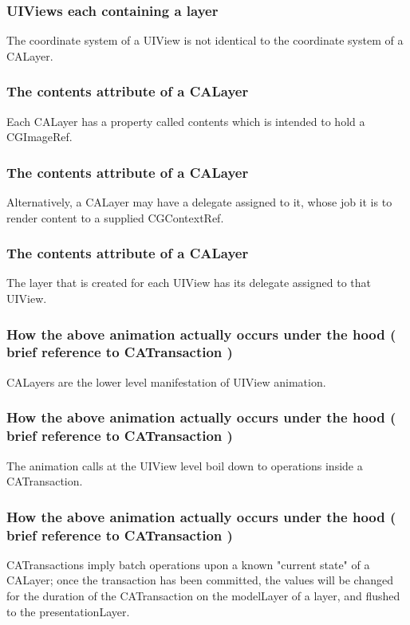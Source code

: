 \documentclass[10pt]{beamer}
\begin{document}
\begin{frame}[fragile]
  \frametitle{UIViews each containing a layer}
  The coordinate system of a UIView is not identical to the coordinate system of a CALayer.

\end{frame}

    
\begin{frame}[fragile]
  \frametitle{The contents attribute of a CALayer}
  Each CALayer has a property called contents which is intended to hold a CGImageRef.

\end{frame}

\begin{frame}[fragile]
  \frametitle{The contents attribute of a CALayer}
  Alternatively, a CALayer may have a delegate assigned to it, whose job it is to render content to a supplied CGContextRef.

\end{frame}

\begin{frame}[fragile]
  \frametitle{The contents attribute of a CALayer}
  The layer that is created for each UIView has its delegate assigned to that UIView.

\end{frame}

    
\begin{frame}[fragile]
  \frametitle{How the above animation actually occurs under the hood ( brief reference to CATransaction )}
  CALayers are the lower level manifestation of UIView animation.

\end{frame}

\begin{frame}[fragile]
  \frametitle{How the above animation actually occurs under the hood ( brief reference to CATransaction )}
  The animation calls at the UIView level boil down to operations inside a CATransaction.

\end{frame}

\begin{frame}[fragile]
  \frametitle{How the above animation actually occurs under the hood ( brief reference to CATransaction )}
  CATransactions imply batch operations upon a known "current state" of a CALayer; once the transaction has been committed, the values will be changed for the duration of the CATransaction on the modelLayer of a layer, and flushed to the presentationLayer.

\end{frame}
\end{document}
